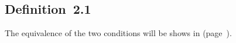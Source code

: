 \subsection{Definition~2.1}

The equivalence of the two conditions will be shows in  (page~\pageref{exercise 2.1}).

